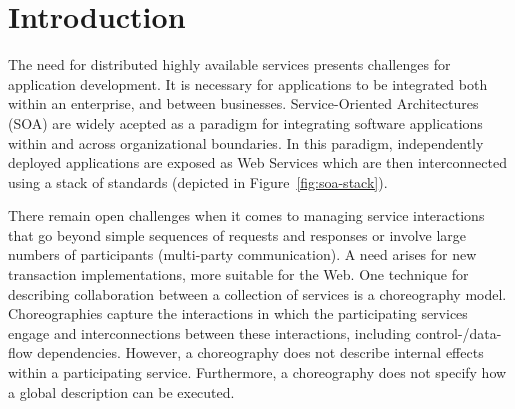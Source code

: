 \documentclass{llncs}
\begin{document}

%
%



\section{Introduction}
\label{sect:introduction}

The need for distributed highly available services presents challenges for application development.
It is necessary for applications to be integrated both within an enterprise, and between businesses.
Service-Oriented Architectures (SOA) are widely acepted as a paradigm for integrating software applications within and across organizational boundaries.
In this paradigm, independently deployed applications are exposed as Web Services which are then 
interconnected using a stack of standards (depicted in Figure~\ref{fig:soa-stack}). 
		
There remain open challenges when it comes to managing service interactions that go beyond simple sequences of requests and responses or involve large numbers of participants (multi-party communication). A need arises for new transaction implementations, more suitable for the Web.
One technique for describing collaboration between a collection of services is a choreography model.
Choreographies capture the interactions in which the participating services engage and interconnections between these interactions, including control-/data-flow dependencies.
However, a choreography does not describe internal effects within a participating service. Furthermore, a choreography does not specify how a global description can be executed.
\end{document}
